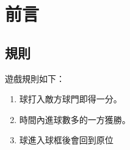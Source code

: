 \chapter{前言}
\renewcommand{\baselinestretch}{10.0} %
\setcounter{page}{1}  %
\fontsize{14pt}{2.5pt}\sectionef
\section{規則}
遊戲規則如下：
\begin{enumerate}
\item 球打入敵方球門即得一分。
\item 時間內進球數多的一方獲勝。
\item 球進入球框後會回到原位
\end{enumerate}
\renewcommand{\baselinestretch}{0.5} %